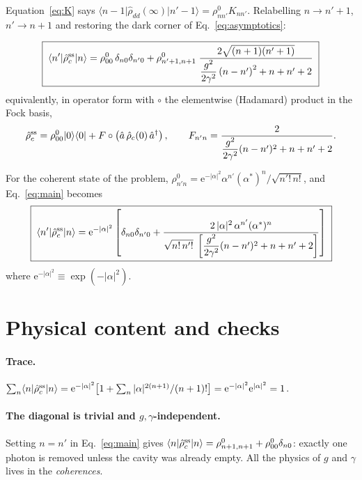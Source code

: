 \documentclass[11pt,a4paper]{article}
\newcommand{\ket}[1]{\lvert #1\rangle}
\newcommand{\bra}[1]{\langle #1\rvert}
\newcommand{\ketbra}[2]{\lvert #1\rangle\langle #2\rvert}
\newcommand{\rhoc}{\hat\rho_{c}}
\newcommand{\ee}{\mathrm{e}}
\newcommand{\Had}{\circ}
\begin{document}
Equation~\eqref{eq:K} says
$\bra{n-1}\hat\rho_{dd}(\infty)\ket{n'-1}=\rho^{0}_{nn'}K_{nn'}$.  Relabelling
$n\to n'+1$, $n'\to n+1$ and restoring the dark corner of
Eq.~\eqref{eq:asymptotics}:

\begin{tcolorbox}[colback=blue!4,colframe=blue!45!black,title=Result --- any
input state]
\begin{equation}
  \boxed{\;
  \bra{n'}\rhoc^{\rm ss}\ket{n}
  =\rho^{0}_{00}\,\delta_{n0}\delta_{n'0}
  +\rho^{0}_{n'+1,n+1}\;
  \frac{2\sqrt{(n+1)(n'+1)}}
  {\dfrac{g^{2}}{2\gamma^{2}}\left(n-n'\right)^{2}+n+n'+2}\;}
  \label{eq:main}
\end{equation}
equivalently, in operator form with $\Had$ the elementwise (Hadamard) product
in the Fock basis,
\begin{equation}
  \rhoc^{\rm ss}=\rho^{0}_{00}\ketbra{0}{0}
  +F\Had\left(\hat a\,\rhoc(0)\,\hat a^{\dagger}\right),
  \qquad
  F_{n'n}=\frac{2}{\dfrac{g^{2}}{2\gamma^{2}}(n-n')^{2}+n+n'+2}.
  \label{eq:hadamard}
\end{equation}
\end{tcolorbox}

\noindent
For the coherent state of the problem, $\rho^{0}_{n'n}=\ee^{-|\alpha|^{2}}
\alpha^{n'}(\alpha^{*})^{n}/\sqrt{n'!\,n!}$, and Eq.~\eqref{eq:main} becomes
\begin{equation}
  \boxed{\;
  \bra{n'}\rhoc^{\rm ss}\ket{n}
  =\ee^{-|\alpha|^{2}}\left[\delta_{n0}\delta_{n'0}
  +\frac{2\,|\alpha|^{2}\,\alpha^{n'}(\alpha^{*})^{n}}
  {\sqrt{n!\,n'!}\;\left[\dfrac{g^{2}}{2\gamma^{2}}(n-n')^{2}+n+n'+2\right]}
  \right]\;}
  \label{eq:coherent}
\end{equation}
where $\ee^{-|\alpha|^2}\equiv\exp(-|\alpha|^2)$.

\section{Physical content and checks}

\paragraph{Trace.}
$\sum_n\bra{n}\rhoc^{\rm ss}\ket{n}
=\ee^{-|\alpha|^{2}}\bigl[1+\sum_n|\alpha|^{2(n+1)}/(n+1)!\bigr]
=\ee^{-|\alpha|^{2}}\ee^{|\alpha|^{2}}=1$.

\paragraph{The diagonal is trivial and $g,\gamma$-independent.}
Setting $n=n'$ in Eq.~\eqref{eq:main} gives
$\bra{n}\rhoc^{\rm ss}\ket{n}=\rho^{0}_{n+1,n+1}+\rho^{0}_{00}\delta_{n0}$:
exactly one photon is removed unless the cavity was already empty.  All the
physics of $g$ and $\gamma$ lives in the \emph{coherences}.
\end{document}

